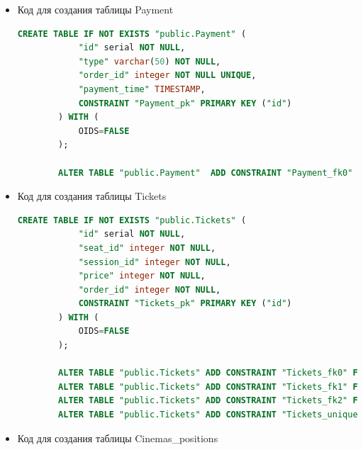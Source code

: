 \documentclass[a4paper,12pt]{article}
\renewcommand{\^}[2]{#1^{\, #2} \kern -1pt}
\newcommand{\1}{\kern 1pt}
\newcommand{\0}{\kern -1pt}
\begin{document}
\begin{itemize}
	\begin{lstlisting}[style=vscode-dark, language=SQL, label={code:sql}]
		CREATE TABLE IF NOT EXISTS "public.Orders" (
			"id" serial NOT NULL,
			"customer_id" integer NOT NULL,
			"isBooked" BOOLEAN DEFAULT(false),
			"total_price" integer NOT NULL DEFAULT 0,
			CONSTRAINT "Orders_pk" PRIMARY KEY ("id")
		) WITH (
			OIDS=FALSE
		);
		
		ALTER TABLE "public.Orders" ADD CONSTRAINT "Orders_fk0" FOREIGN KEY ("customer_id") REFERENCES "public.Customers"("id");
	\end{lstlisting}
	
	\item Код для создания таблицы Payment

	\begin{lstlisting}[style=vscode-dark, language=SQL, label={code:sql}]
		CREATE TABLE IF NOT EXISTS "public.Payment" (
			"id" serial NOT NULL,
			"type" varchar(50) NOT NULL,
			"order_id" integer NOT NULL UNIQUE,
			"payment_time" TIMESTAMP,
			CONSTRAINT "Payment_pk" PRIMARY KEY ("id")
		) WITH (
			OIDS=FALSE
		);
		
		ALTER TABLE "public.Payment"  ADD CONSTRAINT "Payment_fk0" FOREIGN KEY ("order_id") REFERENCES "public.Orders"("id");
	\end{lstlisting}

	\item Код для создания таблицы Tickets

	\begin{lstlisting}[style=vscode-dark, language=SQL, label={code:sql}]
		CREATE TABLE IF NOT EXISTS "public.Tickets" (
			"id" serial NOT NULL,
			"seat_id" integer NOT NULL,
			"session_id" integer NOT NULL,
			"price" integer NOT NULL,
			"order_id" integer NOT NULL,
			CONSTRAINT "Tickets_pk" PRIMARY KEY ("id")
		) WITH (
			OIDS=FALSE
		);
		
		ALTER TABLE "public.Tickets" ADD CONSTRAINT "Tickets_fk0" FOREIGN KEY ("seat_id") REFERENCES "public.Seats"("id");
		ALTER TABLE "public.Tickets" ADD CONSTRAINT "Tickets_fk1" FOREIGN KEY ("session_id") REFERENCES "public.Sessions"("id");
		ALTER TABLE "public.Tickets" ADD CONSTRAINT "Tickets_fk2" FOREIGN KEY ("order_id") REFERENCES "public.Orders"("id");
		ALTER TABLE "public.Tickets" ADD CONSTRAINT "Tickets_unique" UNIQUE("seat_id", "session_id");
	\end{lstlisting}
	\newpage

	\item Код для создания таблицы Cinemas\_positions


\end{itemize}
\end{document}
